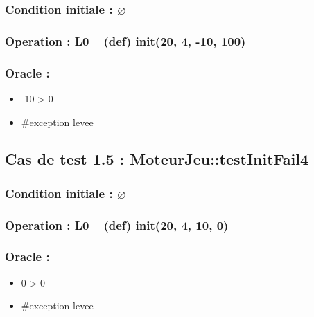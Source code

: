 \documentclass[11pt]{article}
\begin{document}
\subsubsection{Condition initiale : $\varnothing$}
\label{sec-1.4.1}

\subsubsection{Operation : L0 =(def) init(20, 4, -10, 100)}
\label{sec-1.4.2}

\subsubsection{Oracle :}
\label{sec-1.4.3}

\begin{itemize}

\item -10 > 0\\
\label{sec-1.4.3.1}


\item \#exception levee\\
\label{sec-1.4.3.2}


\end{itemize} %
\subsection{Cas de test 1.5 : MoteurJeu::testInitFail4}
\label{sec-1.5}

\subsubsection{Condition initiale : $\varnothing$}
\label{sec-1.5.1}

\subsubsection{Operation : L0 =(def) init(20, 4, 10, 0)}
\label{sec-1.5.2}

\subsubsection{Oracle :}
\label{sec-1.5.3}

\begin{itemize}

\item 0 > 0\\
\label{sec-1.5.3.1}


\item \#exception levee\\
\label{sec-1.5.3.2}







\end{itemize} %
\end{document}
